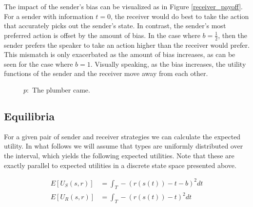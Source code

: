 The impact of the sender's bias can be visualized as in Figure \ref{receiver_payoff}. For a sender with information $t=0$, the receiver would do best to take the action that accurately picks out the sender's state. In contrast, the sender's most preferred action is offset by the amount of bias. In the case where $b=\frac{1}{2}$, then the sender prefers the speaker to take an action higher than the receiver would prefer. This mismatch is only exacerbated as the amount of bias increases, as can be seen for the case where $b=1$. Visually speaking, as the bias increases, the utility functions of the sender and the receiver move away from each other. 


\begin{figure}
\begin{center}
\end{center}
\caption{$p :$ The plumber came.}
\end{figure}

\subsection{Equilibria}

For a given pair of sender and receiver strategies we can calculate the expected utility. In what follows we will assume that types are uniformly distributed over the interval, which yields the following expected utilities. Note that these are exactly parallel to expected utilities in a discrete state space presented above.

\begin{equation}
\begin{split}
     E[U_S(s, r)] &= \int_T -(r(s(t)) - t - b)^2 dt\\
      E[U_R(s, r)] &= \int_T -(r(s(t)) - t)^2 dt
\end{split}
\end{equation}

